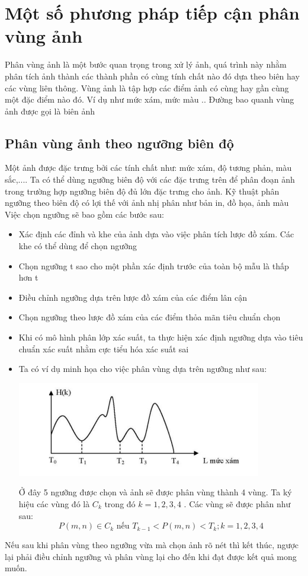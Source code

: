 \documentclass[14pt,oneside,a4paper]{extreport}
\begin{document}
\chapter{Một số phương pháp tiếp cận phân vùng ảnh}
Phân vùng ảnh là một bước quan trọng trong xử lý ảnh, quá trình này nhằm phân tích ảnh thành các thành phần có cùng tính chất nào đó dựa theo biên hay các vùng liên thông. Vùng ảnh là tập hợp các điểm ảnh có cùng hay gần cùng một đặc điểm nào đó. Ví dụ như mức xám, mức màu .. Đường bao quanh vùng ảnh được gọi là biên ảnh
\section{Phân vùng ảnh theo ngưỡng biên độ}
Một ảnh được đặc trưng bởi các tính chất như: mức xám, độ tương phản, màu sắc,.... Ta có thể dùng ngưỡng biên độ với các đặc trưng trên để phân đoạn ảnh trong trường hợp ngưỡng biên độ đủ lớn đặc trưng cho ảnh. Kỹ thuật phân ngưỡng theo biên độ có lợi thế với ảnh nhị phân như bản in, đồ họa, ảnh màu
Việc chọn ngưỡng sẽ bao gồm các bước sau:
\begin{itemize}
\item Xác định các đỉnh và khe của ảnh dựa vào việc phân tích lược đồ xám. Các khe có thể dùng để chọn ngưỡng
\item Chọn ngưỡng t sao cho một phần xác định trước của toàn bộ mẫu là thấp hơn t
\item Điều chỉnh ngưỡng dựa trên lược đồ xám của các điểm lân cận
\item Chọn ngưỡng theo lược đồ xám của các điểm thỏa mãn tiêu chuẩn chọn
\item Khi có mô hình phân lớp xác suất, ta thực hiện xác định ngưỡng dựa vào tiêu chuẩn xác suất nhằm cực tiểu hóa xác suất sai
\item Ta có ví dụ minh họa cho việc phân vùng dựa trên ngưỡng như sau:
\begin{center}
\includegraphics[]{figure/nguongbiendo.png}
\end{center}
Ở đây 5 ngưỡng được chọn và ảnh sẽ được phân vùng thành 4 vùng. Ta ký hiệu các vùng đó là $C_k$ trong đó $k=1,2,3,4$   . Các vùng sẽ được phân như sau:
\begin{equation}
P(m,n) \in C_{k}\textrm{ nếu } T_{k-1}<P(m,n)<T_{k}; k=1,2,3,4
\end{equation} 
\end{itemize}
Nếu sau khi phân vùng theo ngưỡng vừa mà chọn ảnh rõ nét thì kết thúc, ngược lại phải điều chỉnh ngưỡng và phân vùng lại cho đến khi đạt được kết quả mong muốn.
\end{document}
